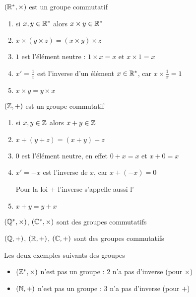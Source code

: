 \begin{frame}

$(\mathbb{R}^*,\times)$ est un groupe commutatif

\pause

   \begin{enumerate}
     \item si $x,y \in \mathbb{R}^*$ alors $x \times y \in \mathbb{R}^*$
\pause
     \item $x\times (y \times z) = (x \times y) \times z$
\pause
     \item $1$ est l'élément neutre : $1 \times x = x$ et $x \times 1=x$
\pause
     \item $x' = \frac{1}{x}$ est l'inverse d'un élément $x \in \mathbb{R}^*$, car $x \times \frac{1}{x}=1$
\pause
     \item $x \times y = y \times x$
   \end{enumerate}



\pause

 $(\mathbb{Z},+)$ est un groupe commutatif

\pause

   \begin{enumerate}
     \item si $x,y \in \mathbb{Z}$ alors $x + y \in \mathbb{Z}$
\pause
     \item $x +  (y + z) = (x + y) + z$
\pause
     \item $0$ est l'élément neutre, en effet $0 + x = x$ et $x + 0=x$
\pause
     \item $x' = -x$ est l'inverse de $x$, car $x + (-x) = 0$  

\hfill Pour la loi $+$ l'inverse s'appelle aussi l'
\pause

     \item $x + y = y + x$
   \end{enumerate}

\end{frame}



\begin{frame}
 $(\mathbb{Q}^*,\times)$, $(\mathbb{C}^*, \times)$ sont des groupes commutatifs

\pause
\bigskip


 $(\mathbb{Q},+)$, $(\mathbb{R},+)$, $(\mathbb{C},+)$ sont des groupes commutatifs  


\pause
\bigskip
\bigskip

Les deux exemples suivants  des groupes
\begin{itemize}
  \item $(\mathbb{Z}^*,\times)$ n'est pas un groupe :  $2$ n'a pas d'inverse (pour $\times$)
  \item $(\mathbb{N},+)$ n'est pas un groupe : $3$ n'a pas d'inverse (pour $+$)
\end{itemize}  


\end{frame}



